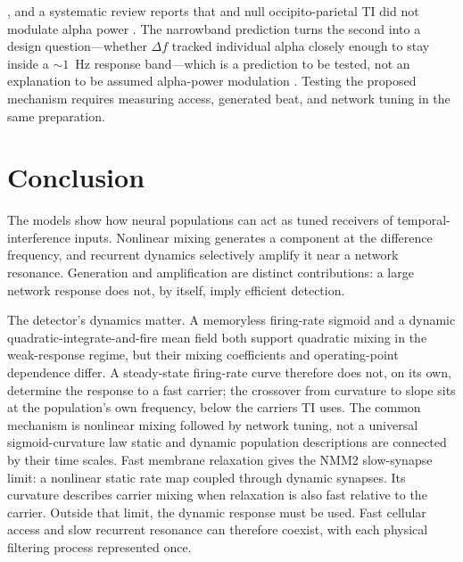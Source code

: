\documentclass[11pt,a4paper]{article}
\providecommand{\DIFaddtex}[1]{{\protect\color{blue} \sf #1}} %
\providecommand{\DIFdeltex}[1]{{\protect\color{red} \scriptsize #1}} %
\providecommand{\DIFaddbegin}{} %
\providecommand{\DIFaddend}{} %
\providecommand{\DIFdelbegin}{} %
\providecommand{\DIFdelend}{} %
\providecommand{\DIFadd}[1]{\texorpdfstring{\DIFaddtex{#1}}{#1}} %
\providecommand{\DIFdel}[1]{\texorpdfstring{\DIFdeltex{#1}}{}} %
\begin{document}
\cite{iszak2023} \DIFdelbegin \DIFdel{, and a systematic
review reports that }\DIFdelend \DIFaddbegin \DIFadd{and null }\DIFaddend occipito-parietal \DIFdelbegin \DIFdel{TI did not modulate alpha power
\cite{mansourinezhad2025}. The narrowband prediction turns the second into a design
question---whether $\Delta f$ tracked individual alpha closely enough to stay inside a
$\sim 1$~Hz response band---which is a prediction to be tested, not an explanation to be
assumed}\DIFdelend \DIFaddbegin \DIFadd{alpha-power modulation
\cite{mansourinezhad2025}. Testing the proposed mechanism requires measuring
access, generated beat, and network tuning in the same preparation}\DIFaddend .

\section{Conclusion}
The models show how neural populations can act as tuned receivers of temporal-interference
inputs. Nonlinear mixing generates a component at the difference frequency, and recurrent
dynamics selectively amplify it near a network resonance. Generation and amplification are
distinct contributions: a large network response does not, by itself, imply efficient
detection.

The \DIFdelbegin \DIFdel{detector's dynamics matter. A memoryless firing-rate sigmoid and a dynamic quadratic-integrate-and-fire mean field both support quadratic mixing in the
weak-response regime, but their mixing coefficients and operating-point dependence differ.
A steady-state firing-rate curve therefore does not, on its own, determine the response to
a fast carrier; the crossover from curvature to slope sits at the population's own
frequency, below the carriers TI uses. The common mechanism is nonlinear mixing followed by
network tuning, not a universal sigmoid-curvature law}\DIFdelend \DIFaddbegin \DIFadd{static and dynamic population descriptions are connected by their time scales.
Fast membrane relaxation gives the NMM2 slow-synapse limit: a nonlinear static rate
map coupled through dynamic synapses. Its curvature describes carrier mixing when
relaxation is also fast relative to the carrier. Outside that limit, the dynamic
response must be used. Fast cellular access and slow recurrent resonance can
therefore coexist, with each physical filtering process represented once}\DIFaddend .
\end{document}

